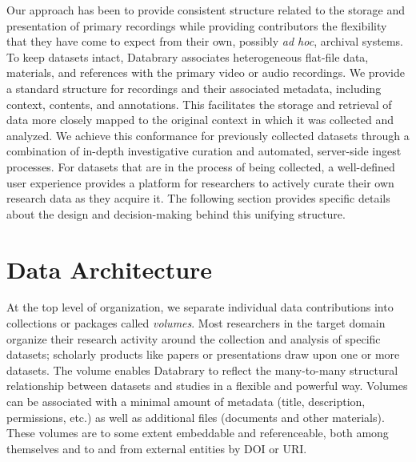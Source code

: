 \documentclass{sig-alternate}
\begin{document}
Our approach has been to provide consistent structure related to the storage and presentation of primary recordings while providing contributors the flexibility that they have come to expect from their own, possibly \emph{ad hoc}, archival systems.
To keep datasets intact, Databrary associates heterogeneous flat-file data, materials, and references with the primary video or audio recordings.
We provide a standard structure for recordings and their associated metadata, including context, contents, and annotations. This facilitates the storage and retrieval of data more closely mapped to the original context in which it was collected and analyzed.
We achieve this conformance for previously collected datasets through a combination of in-depth investigative curation and automated, server-side ingest processes.
For datasets that are in the process of being collected, a well-defined user experience provides a platform for researchers to actively curate their own research data as they acquire it.
The following section provides specific details about the design and decision-making behind this unifying structure.

\section{Data Architecture}


At the top level of organization, we separate individual data contributions into collections or packages called \emph{volumes}.
Most researchers in the target domain organize their research activity around the collection and analysis of specific datasets; scholarly products like papers or presentations draw upon one or more datasets. 
The volume enables Databrary to reflect the many-to-many structural relationship between datasets and studies in a flexible and powerful way.
Volumes can be associated with a minimal amount of metadata (title, description, permissions, etc.) as well as additional files (documents and other materials).
These volumes are to some extent embeddable and referenceable, both among themselves and to and from external entities by DOI or URI.
\end{document}
